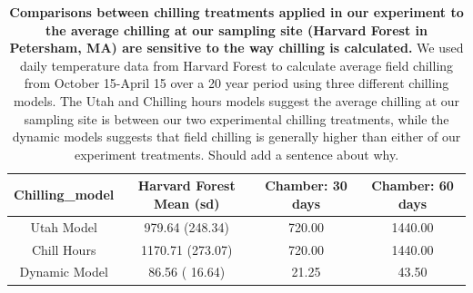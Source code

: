 \documentclass[11pt]{article}
\begin{document}
\begin{table}[!ht]
\begin{tabular}{cccc}
  \hline
 Chilling\_model & Harvard Forest Mean (sd) & Chamber: 30 days & Chamber: 60 days \\ 
  \hline
 Utah Model & 979.64  (248.34) & 720.00 & 1440.00 \\ 
Chill Hours & 1170.71 (273.07) & 720.00 & 1440.00 \\ 
 Dynamic Model & 86.56 ( 16.64) & 21.25 & 43.50 \\ 
   \hline
\end{tabular}
\caption{\textbf{Comparisons between chilling treatments applied in our experiment to the average chilling at our sampling site (Harvard Forest in Petersham, MA)  are sensitive to the way chilling is calculated.} We used daily temperature data from Harvard Forest \citep{} to calculate average field chilling from October 15-April 15 over a 20 year period using three different chilling models. The Utah and Chilling hours models suggest the average chilling at our sampling site is between our two experimental chilling treatments, while the dynamic models suggests that field chilling is generally higher than either of our experiment treatments. Should add a sentence about why.}
\label{tab:chillcomps}
\end{table}
\end{document}
